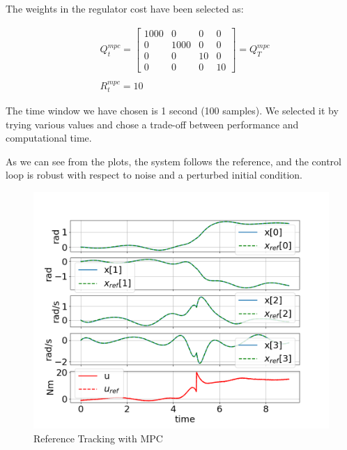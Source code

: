 The weights in the regulator cost have been selected as:

\begin{equation*}
    \begin{aligned}
        &Q_t^{mpc} = \begin{bmatrix}
            1000 & 0 & 0 & 0 \\
            0 & 1000 & 0 & 0 \\
            0 & 0 & 10 & 0\\
            0 & 0 & 0 & 10
        \end{bmatrix} = Q_T^{mpc}\\
        &\\
    & R^{mpc}_t = 10
    \end{aligned}
\end{equation*}

The time window we have chosen is 1 second (100 samples). We selected it by trying various values and chose a trade-off between performance and computational time.

As we can see from the plots, the system follows the reference, and the control loop is robust with respect to noise and a perturbed initial condition.

\begin{figure}
    \centering
    \includegraphics[width=0.8\linewidth]{figs/downward_mpc_track.png}
    \caption{Reference Tracking with MPC}
    \label{fig:downward_mpc_track}
\end{figure}

